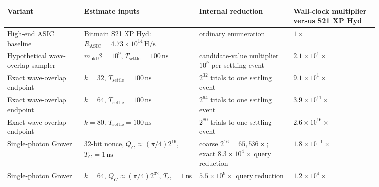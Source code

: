 \documentclass[11pt]{article}
\theoremstyle{definition}
\theoremstyle{remark}
\begin{document}
\begin{center}
\begin{minipage}{\linewidth}
\centering
\scriptsize
\setlength{\tabcolsep}{3pt}
\begin{tabular}{@{}L{0.18\linewidth}L{0.27\linewidth}L{0.22\linewidth}L{0.20\linewidth}@{}}
\toprule
Variant & Estimate inputs & Internal reduction & Wall-clock multiplier versus S21 XP Hyd\\
\midrule
High-end ASIC baseline & Bitmain S21 XP Hyd:
\(R_{\mathrm{ASIC}}=4.73\times10^{14}\,\mathrm{H/s}\) &
ordinary enumeration & \(1\times\)\\
Hypothetical wave-overlap sampler & \(m_{\mathrm{pkt}}\beta=10^9\),
\(T_{\mathrm{settle}}=100\,\mathrm{ns}\) &
candidate-value multiplier \(10^9\) per settling event &
\(2.1\times10^1\times\)\\
Exact wave-overlap endpoint & \(k=32\),
\(T_{\mathrm{settle}}=100\,\mathrm{ns}\) &
\(2^{32}\) trials to one settling event &
\(9.1\times10^1\times\)\\
Exact wave-overlap endpoint & \(k=64\),
\(T_{\mathrm{settle}}=100\,\mathrm{ns}\) &
\(2^{64}\) trials to one settling event &
\(3.9\times10^{11}\times\)\\
Exact wave-overlap endpoint & \(k=80\),
\(T_{\mathrm{settle}}=100\,\mathrm{ns}\) &
\(2^{80}\) trials to one settling event &
\(2.6\times10^{16}\times\)\\
Single-photon Grover & 32-bit nonce,
\(Q_G\approx(\pi/4)2^{16}\), \(T_G=1\,\mathrm{ns}\) &
coarse \(2^{16}=65{,}536\times\);
exact \(8.3\times10^4\times\) query reduction &
\(1.8\times10^{-1}\times\)\\
Single-photon Grover & \(k=64\),
\(Q_G\approx(\pi/4)2^{32}\), \(T_G=1\,\mathrm{ns}\) &
\(5.5\times10^9\times\) query reduction &
\(1.2\times10^4\times\)\\
\bottomrule
\end{tabular}
\label{tab:numericalspeedups}
\end{minipage}
\end{center}
\end{document}
